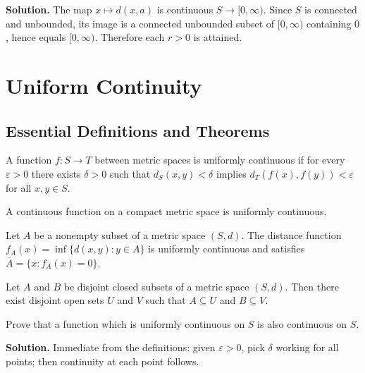 \noindent\textbf{Solution.}
The map $x\mapsto d(x,a)$ is continuous $S\to[0,\infty)$. Since $S$ is connected and unbounded, its image is a connected unbounded subset of $[0,\infty)$ containing $0$, hence equals $[0,\infty)$. Therefore each $r>0$ is attained.
\medskip

\section{Uniform Continuity}

\subsection*{Essential Definitions and Theorems}

\begin{definition}
A function $f: S \to T$ between metric spaces is uniformly continuous if for every $\varepsilon > 0$ there exists $\delta > 0$ such that $d_S(x,y) < \delta$ implies $d_T(f(x), f(y)) < \varepsilon$ for all $x,y \in S$.
\end{definition}

\begin{theorem}
A continuous function on a compact metric space is uniformly continuous.
\end{theorem}

\begin{theorem}
Let $A$ be a nonempty subset of a metric space $(S,d)$. The distance function $f_A(x) = \inf\{d(x,y) : y \in A\}$ is uniformly continuous and satisfies $\overline{A} = \{x : f_A(x) = 0\}$.
\end{theorem}

\begin{theorem}
Let $A$ and $B$ be disjoint closed subsets of a metric space $(S,d)$. Then there exist disjoint open sets $U$ and $V$ such that $A \subseteq U$ and $B \subseteq V$.
\end{theorem}

\begin{problembox}
Prove that a function which is uniformly continuous on $S$ is also continuous on $S$.
\end{problembox}

\noindent\textbf{Solution.}
Immediate from the definitions: given $\varepsilon>0$, pick $\delta$ working for all points; then continuity at each point follows.
\medskip

